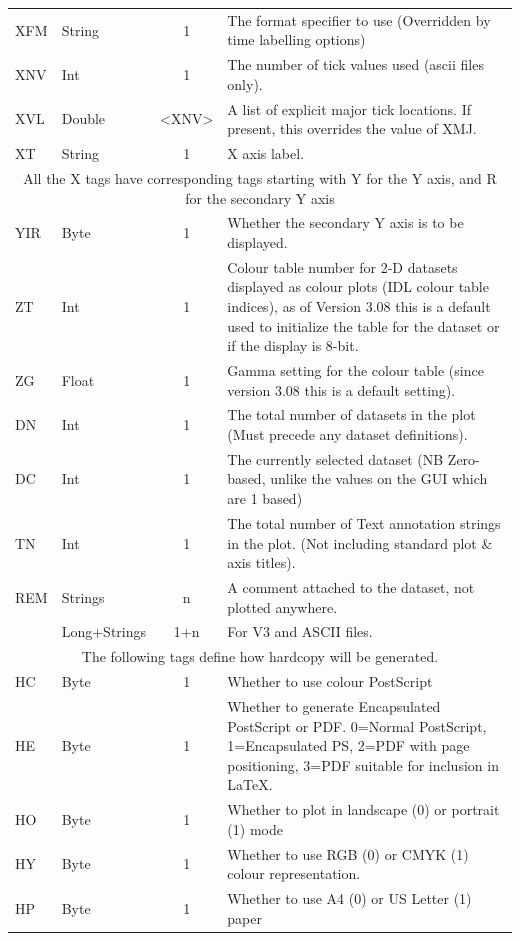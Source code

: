 \documentclass[english]{article}
\begin{document}
\begin{longtable}{|llcp{9cm}|}
  XFM & String & 1 & The format specifier to use (Overridden by time
  labelling options) \\
  XNV & Int & 1 & The number of tick values used (ascii files only).\\
  XVL & Double & <XNV> & A list of explicit major tick locations. If
  present, this overrides the value of XMJ.\\
  XT& String& 1&
  X axis label.\\
  \hline \multicolumn{4}{|c|}{All the X tags have corresponding tags
    starting
    with Y for the Y axis, and R for the secondary Y axis}\\
  \hline
  YIR & Byte & 1 & Whether the secondary Y axis is to be displayed.\\
  \hline ZT& Int& 1& Colour table number for 2-D datasets displayed as
  colour plots (IDL colour table indices), as of Version 3.08 this is a
  default used to initialize the table for the dataset or if the
  display is 8-bit.\\
  ZG& Float& 1& Gamma setting for the colour table (since version 3.08
  this is a
  default setting).\\
  DN& Int& 1& The total number of datasets in the plot (Must precede
  any dataset
  definitions).\\
  DC& Int& 1& The currently selected dataset (NB Zero-based, unlike the
  values on
  the GUI which are 1 based)\\
  TN& Int& 1& The total number of Text annotation strings in the
  plot. (Not including
  standard plot \& axis titles).\\
  REM& Strings& n&
  A comment attached to the dataset, not plotted anywhere.\\
  & Long+Strings& 1+n&
  For V3 and ASCII files.\\
  \hline
  \multicolumn{4}{|c|}{The following tags define how hardcopy will be
    generated.}\\ 
  \hline HC& Byte& 1&
  Whether to use colour PostScript\\
  HE& Byte& 1&
  Whether to generate Encapsulated PostScript or PDF. 0=Normal
  PostScript, 1=Encapsulated PS, 2=PDF with page positioning, 3=PDF
  suitable for inclusion in \LaTeX.\\
  HO& Byte& 1&
  Whether to plot in landscape (0) or portrait (1) mode\\
  HY& Byte & 1 & Whether to use RGB (0) or CMYK (1) colour representation.\\
  HP& Byte& 1&
  Whether to use A4 (0) or US Letter (1) paper\\

\end{longtable}
\end{document}
